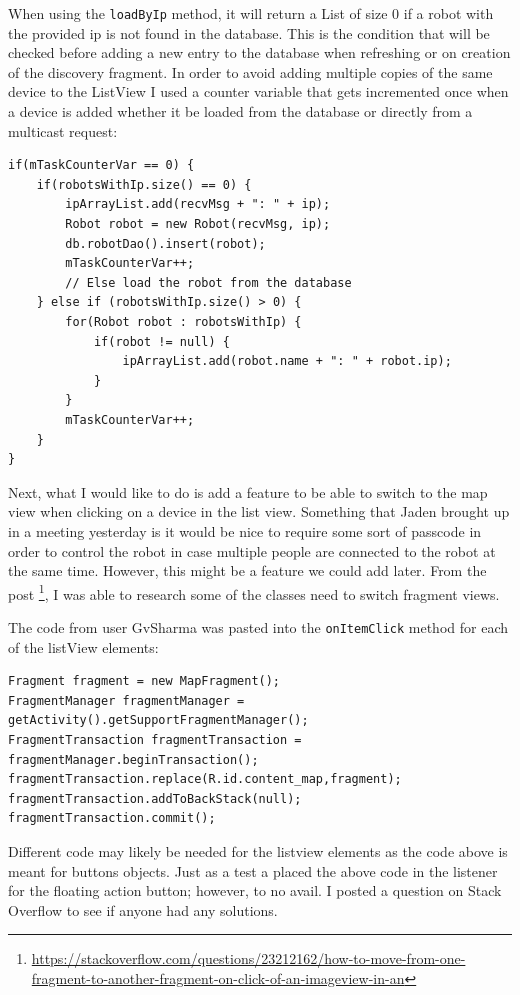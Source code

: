 \documentclass[fontsize=11pt, %
                             paper=a4, %
                             twoside, %
                             captions=tableheading,
                             index=totoc,
                             hyperref]{labbook}
\begin{document}
\begin{addmargin}[0cm]{0cm}
When using the \texttt{loadByIp} method, it will return a List of size $0$ if a robot with the provided ip is not found in the database. This is the condition that will be checked before adding a new entry to the database when refreshing or on creation of the discovery fragment. In order to avoid adding multiple copies of the same device to the ListView I used a counter variable that gets incremented once when a device is added whether it be loaded from the database or directly from a multicast request:
\begin{Verbatim}[tabsize=4]
if(mTaskCounterVar == 0) {
	if(robotsWithIp.size() == 0) {
		ipArrayList.add(recvMsg + ": " + ip);
		Robot robot = new Robot(recvMsg, ip);
		db.robotDao().insert(robot);
		mTaskCounterVar++;
		// Else load the robot from the database
	} else if (robotsWithIp.size() > 0) {
		for(Robot robot : robotsWithIp) {
			if(robot != null) {
				ipArrayList.add(robot.name + ": " + robot.ip);
			}
		}
		mTaskCounterVar++;
	}
}
\end{Verbatim}
Next, what I would like to do is add a feature to be able to switch to the map view when clicking on a device in the list view. Something that Jaden brought up in a meeting yesterday is it would be nice to require some sort of passcode in order to control the robot in case multiple people are connected to the robot at the same time. However, this might be a feature we could add later.
\medbreak\noindent
From the post \footnote{\url{https://stackoverflow.com/questions/23212162/how-to-move-from-one-fragment-to-another-fragment-on-click-of-an-imageview-in-an}}, I was able to research some of the classes need to switch fragment views.

The code from user GvSharma was pasted into the \texttt{onItemClick} method for each of the listView elements:
\begin{Verbatim}
Fragment fragment = new MapFragment();
FragmentManager fragmentManager = getActivity().getSupportFragmentManager();
FragmentTransaction fragmentTransaction = fragmentManager.beginTransaction();
fragmentTransaction.replace(R.id.content_map,fragment);
fragmentTransaction.addToBackStack(null);
fragmentTransaction.commit();
\end{Verbatim} 
Different code may likely be needed for the listview elements as the code above is meant for buttons objects. Just as a test a placed the above code in the listener for the floating action button; however, to no avail. I posted a question on Stack Overflow to see if anyone had any solutions.


\end{addmargin}
\end{document}
